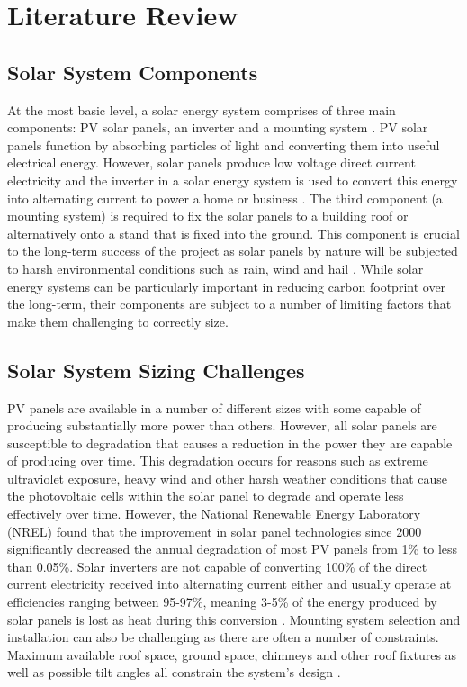 \documentclass[a4paper,11pt,fleqn]{report}
\begin{document}
\chapter{Literature Review} \label{chp: 2 LitRev}

\section{Solar System Components} \label{sec: System Components}
At the most basic level, a solar energy system comprises of three main components: \ac{PV} solar panels, an inverter and a mounting system \citep{Wenham2013}. \ac{PV} solar panels function by absorbing particles of light and converting them into useful electrical energy. However, solar panels produce low voltage direct current electricity and the inverter in a solar energy system is used to convert this energy into alternating current to power a home or business \citep{Hantula2010}. The third component (a mounting system) is required to fix the solar panels to a building roof or alternatively onto a stand that is fixed into the ground. This component is crucial to the long-term success of the project as solar panels by nature will be subjected to harsh environmental conditions such as rain, wind and hail \citep{Wenham2013}. While solar energy systems can be particularly important in reducing carbon footprint over the long-term, their components are subject to a number of limiting factors that make them challenging to correctly size.

\section{Solar System Sizing Challenges} \label{sec: Size Challenges}
\ac{PV} panels are available in a number of different sizes with some capable of producing substantially more power than others. However, all solar panels are susceptible to degradation that causes a reduction in the power they are capable of producing over time\citep{Jordan2013}. This degradation occurs for reasons such as extreme ultraviolet exposure, heavy wind and other harsh weather conditions that cause the photovoltaic cells within the solar panel to degrade and operate less effectively over time. However, the National Renewable Energy Laboratory (NREL) \citep{Jordan2013} found that the improvement in solar panel technologies since 2000 significantly decreased the annual degradation of most \ac{PV} panels from 1\% to less than 0.05\%. Solar inverters are not capable of converting 100\% of the direct current electricity received into alternating current either and usually operate at efficiencies ranging between 95-97\%, meaning 3-5\% of the energy produced by solar panels is lost as heat during this conversion \citep{eltawil2010}. Mounting system selection and installation can also be challenging as there are often a number of constraints. Maximum available roof space, ground space, chimneys and other roof fixtures as well as possible tilt angles all constrain the system's design \citep{Bradley2003}. 
\end{document}
